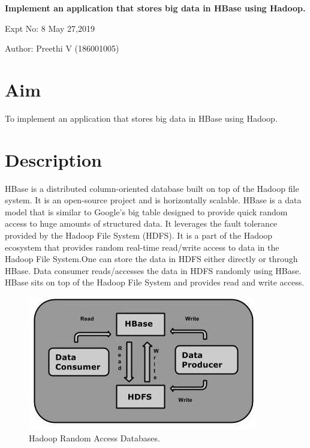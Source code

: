 \documentclass[a4paper,10pt]{article}
\begin{document}
\setcounter{secnumdepth}{-1} 

\begin{center}
\textbf{\LARGE Implement an application that stores big data in HBase using Hadoop.}
\end{center}

\raggedright Expt No: 8 \hfill \raggedleft May 27,2019 \\ 

\raggedright Author: Preethi V (186001005) \par 


\section{Aim}
To implement an application that stores big data in HBase using Hadoop.

\section{Description}
         	HBase is a distributed column-oriented database built on top of the Hadoop file system. It is an open-source project and is horizontally scalable. HBase is a data model that is similar to Google’s big table designed to provide quick random access to huge amounts of structured data. It leverages the fault tolerance provided by the Hadoop File System (HDFS).
			It is a part of the Hadoop ecosystem that provides random real-time read/write access to data in the Hadoop File System.One can store the data in HDFS either directly or through HBase. Data consumer reads/accesses the data in HDFS randomly using HBase. HBase sits on top of the Hadoop File System and provides read and write access.
	
\begin{figure}[h]
	\includegraphics[scale=0.33,center]{0.jpg}
	\caption{Hadoop Random Access Databases.}
	\label{fig:1}
\end{figure}
\end{document}
